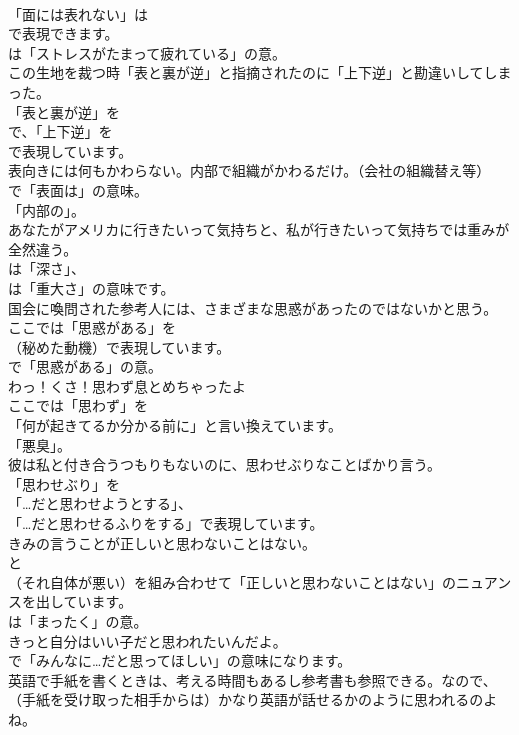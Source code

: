 \documentclass[8pt]{extreport}
\begin{document}
\begin{CJK}{UTF8}{min}
\\	「面には表れない」は
\\	で表現できます。
\\	は「ストレスがたまって疲れている」の意。	
\\	この生地を裁つ時「表と裏が逆」と指摘されたのに「上下逆」と勘違いしてしまった。 
\\	「表と裏が逆」を
\\	で、「上下逆」を
\\	で表現しています。	
\\	表向きには何もかわらない。内部で組織がかわるだけ。（会社の組織替え等） 
\\	で「表面は」の意味。
\\	「内部の」。	
\\	あなたがアメリカに行きたいって気持ちと、私が行きたいって気持ちでは重みが全然違う。 
\\	は「深さ」、
\\	は「重大さ」の意味です。	
\\	国会に喚問された参考人には、さまざまな思惑があったのではないかと思う。 
\\	ここでは「思惑がある」を 
\\	（秘めた動機）で表現しています。
\\	で「思惑がある」の意。	
\\	わっ！くさ！思わず息とめちゃったよ 
\\	ここでは「思わず」を
\\	「何が起きてるか分かる前に」と言い換えています。
\\	「悪臭」。	
\\	彼は私と付き合うつもりもないのに、思わせぶりなことばかり言う。 
\\	「思わせぶり」を
\\	「…だと思わせようとする」、
\\	「…だと思わせるふりをする」で表現しています。	
\\	きみの言うことが正しいと思わないことはない。 
\\	と 
\\	（それ自体が悪い）を組み合わせて「正しいと思わないことはない」のニュアンスを出しています。
\\	は「まったく」の意。	
\\	きっと自分はいい子だと思われたいんだよ。 
\\	で「みんなに…だと思ってほしい」の意味になります。	
\\	英語で手紙を書くときは、考える時間もあるし参考書も参照できる。なので、（手紙を受け取った相手からは）かなり英語が話せるかのように思われるのよね。 

\end{CJK}
\end{document}
